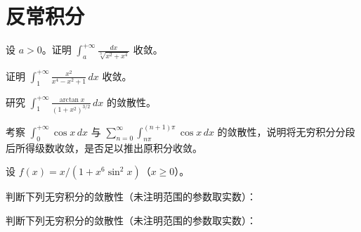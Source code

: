 \renewcommand{\thesection}{\arabic{section}}\renewcommand{\theHsection}{chapter.\arabic{section}}\setcounter{section}{15}\section{反常积分}
\noindent\begin{minipage}{\textwidth}
设 $a>0$。证明 $\displaystyle\int_a^{+\infty}\frac{dx}{\sqrt[3]{x^2+x^4}}$ 收敛。
\end{minipage}\par\vfill
\noindent\begin{minipage}{\textwidth}
证明 $\displaystyle\int_1^{+\infty}\frac{x^2}{x^4-x^2+1}\,dx$ 收敛。
\end{minipage}\par\vfill
\noindent\begin{minipage}{\textwidth}
研究 $\displaystyle\int_1^{+\infty}\frac{\arctan x}{(1+x^2)^{3/2}}\,dx$ 的敛散性。
\end{minipage}\par\vfill
\newpage
\noindent\begin{minipage}{\textwidth}
考察 $\displaystyle\int_0^{+\infty}\cos x\,dx$ 与 $\displaystyle\sum_{n=0}^{\infty}\int_{n\pi}^{(n+1)\pi}\cos x\,dx$ 的敛散性，说明将无穷积分分段后所得级数收敛，是否足以推出原积分收敛。
\end{minipage}\par\vfill
\noindent\begin{minipage}{\textwidth}
设 $f(x)=x/(1+x^6\sin^2x)$（$x\ge0$）。
\SubQ{2}{证明 $f$ 在 $[0,+\infty)$ 上无界。由此说明无穷积分收敛并不保证被积函数在无穷远处趋于 $0$。}
\end{minipage}\par\vfill
\noindent\begin{minipage}{\textwidth}
判断下列无穷积分的敛散性（未注明范围的参数取实数）：
\end{minipage}\par\vfill
\newpage
\noindent\begin{minipage}{\textwidth}
判断下列无穷积分的敛散性（未注明范围的参数取实数）：
\end{minipage}\par\vfill
